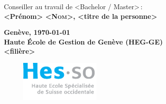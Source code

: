 \noindent \begin{center}
{\Large Conseiller au travail de <Bachelor / Master>\,:}\\
\textbf{\Large{} <Prénom> \textsc{<Nom>}, <titre de la personne>}
\par\end{center}{\Large \par}


\noindent \begin{center}
\textbf{\large Genève, \today{}}\\
\textbf{\large Haute École de Gestion de Genève (HEG-GE)}\\
\textbf{\large <filière>}
\par\end{center}{\large \par}



\begin{figure}[H]
	\begin{flushright}
		\includegraphics[width=4cm]{images/hes-logo.eps}
	\end{flushright}
\end{figure}

\thispagestyle{empty}
\styleCenter

